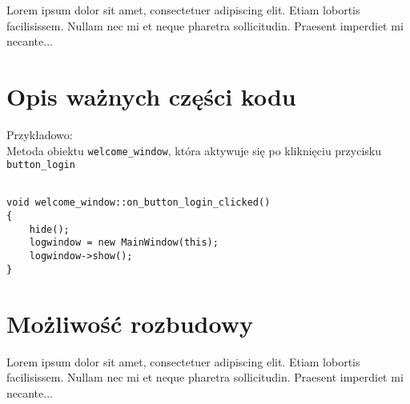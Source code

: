 \documentclass{article}
\begin{document}
 
Lorem ipsum dolor sit amet, consectetuer adipiscing elit.  
Etiam lobortis facilisissem.  Nullam nec mi et neque pharetra 
sollicitudin.  Praesent imperdiet mi necante...

\section{Opis ważnych części kodu}
 
Przykładowo: \\

Metoda obiektu \verb|welcome_window|, która aktywuje się po kliknięciu przycisku \verb|button_login|
\\

\begin{tcolorbox}
\begin{lstlisting}

void welcome_window::on_button_login_clicked()
{
    hide();
    logwindow = new MainWindow(this);
    logwindow->show();
}

\end{lstlisting}
\end{tcolorbox}

\section{Możliwość rozbudowy}
 
Lorem ipsum dolor sit amet, consectetuer adipiscing elit.  
Etiam lobortis facilisissem.  Nullam nec mi et neque pharetra 
sollicitudin.  Praesent imperdiet mi necante...
 
\end{document}
